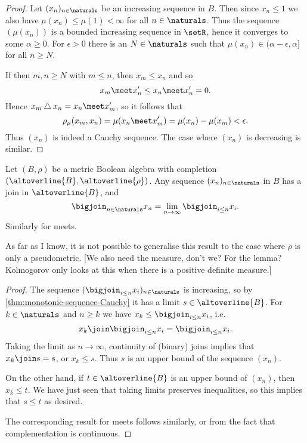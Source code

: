 \documentclass[article, a4paper, 11pt, oneside]{memoir}
\numberwithin{equation}{chapter}
\renewcommand{\symdiff}{\mathbin{\triangle}}
\begin{document}
\begin{proof}
    Let $(x_n)_{n\in\naturals}$ be an increasing sequence in $B$. Then since $x_n \leq 1$ we also have $\mu(x_n) \leq \mu(1) < \infty$ for all $n \in \naturals$. Thus the sequence $(\mu(x_n))$ is a bounded increasing sequence in $\setR$, hence it converges to some $\alpha \geq 0$. For $\epsilon > 0$ there is an $N \in \naturals$ such that $\mu(x_n) \in (\alpha - \epsilon, \alpha]$ for all $n \geq N$.
    
    If then $m,n \geq N$ with $m \leq n$, then $x_m \leq x_n$ and so
    \begin{equation*}
        x_m \meet x_n'
            \leq x_n \meet x_n'
            = 0.
    \end{equation*}
    Hence $x_m \symdiff x_n = x_n \meet x_m'$, so it follows that
    \begin{equation*}
        \rho_\mu(x_m,x_n)
            = \mu(x_n \meet x_m')
            = \mu(x_n) - \mu(x_m)
            < \epsilon.
    \end{equation*}
    Thus $(x_n)$ is indeed a Cauchy sequence. The case where $(x_n)$ is decreasing is similar.
\end{proof}


\begin{proposition}
    \label{thm:existence-of-joins}
    Let $(B,\rho)$ be a metric Boolean algebra with completion $(\altoverline{B}, \altoverline{\rho})$. Any sequence $(x_n)_{n\in\naturals}$ in $B$ has a join in $\altoverline{B}$, and
    \begin{equation*}
        \bigjoin_{n\in\naturals} x_n
            = \lim_{n\to\infty} \bigjoin_{i \leq n} x_i.
    \end{equation*}
    Similarly for meets.
\end{proposition}
%
As far as I know, it is not possible to generalise this result to the case where $\rho$ is only a pseudometric. [We also need the measure, don't we? For the lemma? Kolmogorov only looks at this when there is a positive definite measure.]

\begin{proof}
    The sequence $( \bigjoin_{i \leq n} x_i )_{n\in\naturals}$ is increasing, so by \cref{thm:monotonic-sequence-Cauchy} it has a limit $s \in \altoverline{B}$. For $k \in \naturals$ and $n \geq k$ we have $x_k \leq \bigjoin_{i \leq n} x_i$, i.e.
    \begin{equation*}
        x_k \join \bigjoin_{i \leq n} x_i
            = \bigjoin_{i \leq n} x_i.
    \end{equation*}
    Taking the limit as $n \to \infty$, continuity of (binary) joins implies that $x_k \join s = s$, or $x_k \leq s$. Thus $s$ is an upper bound of the sequence $(x_n)$.

    On the other hand, if $t \in \altoverline{B}$ is an upper bound of $(x_n)$, then $x_k \leq t$. We have just seen that taking limits preserves inequalities, so this implies that $s \leq t$ as desired.

    The corresponding result for meets follows similarly, or from the fact that complementation is continuous.
\end{proof}
\end{document}
